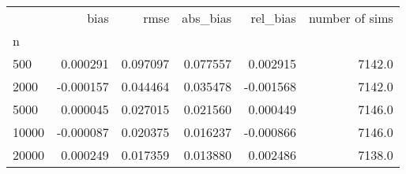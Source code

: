 \begin{tabular}{lrrrrr}
\toprule
{} &      bias &      rmse &  abs_bias &  rel_bias &  number of sims \\
n     &           &           &           &           &                 \\
\midrule
500   &  0.000291 &  0.097097 &  0.077557 &  0.002915 &          7142.0 \\
2000  & -0.000157 &  0.044464 &  0.035478 & -0.001568 &          7142.0 \\
5000  &  0.000045 &  0.027015 &  0.021560 &  0.000449 &          7146.0 \\
10000 & -0.000087 &  0.020375 &  0.016237 & -0.000866 &          7146.0 \\
20000 &  0.000249 &  0.017359 &  0.013880 &  0.002486 &          7138.0 \\
\bottomrule
\end{tabular}
